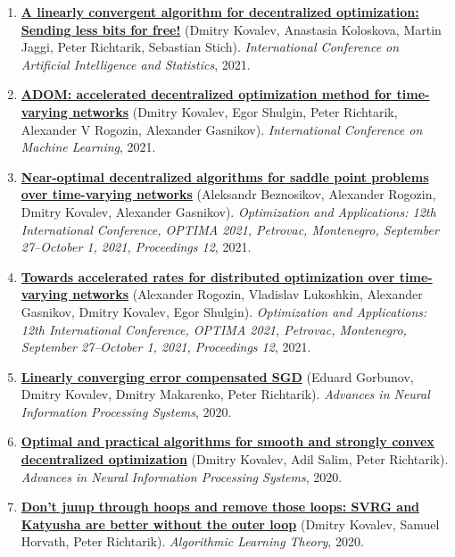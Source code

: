 \begin{enumerate}
\item
\textbf{\href{https://proceedings.mlr.press/v130/kovalev21a.html}{A linearly convergent algorithm for decentralized optimization: Sending less bits for free!}} (Dmitry Kovalev, Anastasia Koloskova, Martin Jaggi, Peter Richtarik, Sebastian Stich). \textit{International Conference on Artificial Intelligence and Statistics}, 2021.
\item
\textbf{\href{http://proceedings.mlr.press/v139/kovalev21a}{ADOM: accelerated decentralized optimization method for time-varying networks}} (Dmitry Kovalev, Egor Shulgin, Peter Richtarik, Alexander V Rogozin, Alexander Gasnikov). \textit{International Conference on Machine Learning}, 2021.
\item
\textbf{\href{https://link.springer.com/chapter/10.1007/978-3-030-91059-4_18}{Near-optimal decentralized algorithms for saddle point problems over time-varying networks}} (Aleksandr Beznosikov, Alexander Rogozin, Dmitry Kovalev, Alexander Gasnikov). \textit{Optimization and Applications: 12th International Conference, OPTIMA 2021, Petrovac, Montenegro, September 27–October 1, 2021, Proceedings 12}, 2021.
\item
\textbf{\href{https://link.springer.com/chapter/10.1007/978-3-030-91059-4_19}{Towards accelerated rates for distributed optimization over time-varying networks}} (Alexander Rogozin, Vladislav Lukoshkin, Alexander Gasnikov, Dmitry Kovalev, Egor Shulgin). \textit{Optimization and Applications: 12th International Conference, OPTIMA 2021, Petrovac, Montenegro, September 27–October 1, 2021, Proceedings 12}, 2021.
\item
\textbf{\href{https://proceedings.neurips.cc/paper_files/paper/2020/hash/ef9280fbc5317f17d480e4d4f61b3751-Abstract.html}{Linearly converging error compensated SGD}} (Eduard Gorbunov, Dmitry Kovalev, Dmitry Makarenko, Peter Richtarik). \textit{Advances in Neural Information Processing Systems}, 2020.
\item
\textbf{\href{https://proceedings.neurips.cc/paper_files/paper/2020/hash/d530d454337fb09964237fecb4bea6ce-Abstract.html}{Optimal and practical algorithms for smooth and strongly convex decentralized optimization}} (Dmitry Kovalev, Adil Salim, Peter Richtarik). \textit{Advances in Neural Information Processing Systems}, 2020.
\item
\textbf{\href{https://proceedings.mlr.press/v117/kovalev20a.html}{Don’t jump through hoops and remove those loops: SVRG and Katyusha are better without the outer loop}} (Dmitry Kovalev, Samuel Horvath, Peter Richtarik). \textit{Algorithmic Learning Theory}, 2020.

\end{enumerate}
